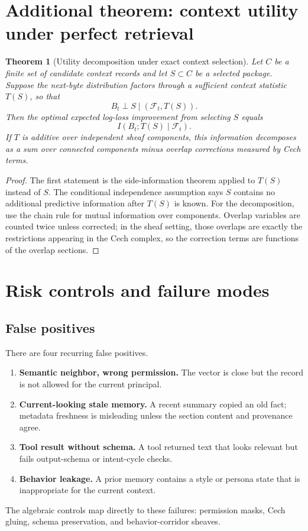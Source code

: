 \documentclass[11pt]{article}
\newtheorem{theorem}{Theorem}[section]
\numberwithin{equation}{section}
\begin{document}
\section{Additional theorem: context utility under perfect retrieval}
\begin{theorem}[Utility decomposition under exact context selection]
Let $C$ be a finite set of candidate context records and let $S\subset C$ be a selected package. Suppose the next-byte distribution factors through a sufficient context statistic $T(S)$, so that
\begin{equation}
B_t\perp S\mid (\mathcal{F}_t,T(S)).
\end{equation}
Then the optimal expected log-loss improvement from selecting $S$ equals
\begin{equation}
I(B_t;T(S)\mid\mathcal{F}_t).
\end{equation}
If $T$ is additive over independent sheaf components, this information decomposes as a sum over connected components minus overlap corrections measured by Cech terms.
\end{theorem}
\begin{proof}
The first statement is the side-information theorem applied to $T(S)$ instead of $S$. The conditional independence assumption says $S$ contains no additional predictive information after $T(S)$ is known. For the decomposition, use the chain rule for mutual information over components. Overlap variables are counted twice unless corrected; in the sheaf setting, those overlaps are exactly the restrictions appearing in the Cech complex, so the correction terms are functions of the overlap sections.
\end{proof}

\section{Risk controls and failure modes}
\subsection{False positives}
There are four recurring false positives.
\begin{enumerate}
\item \textbf{Semantic neighbor, wrong permission.} The vector is close but the record is not allowed for the current principal.
\item \textbf{Current-looking stale memory.} A recent summary copied an old fact; metadata freshness is misleading unless the section content and provenance agree.
\item \textbf{Tool result without schema.} A tool returned text that looks relevant but fails output-schema or intent-cycle checks.
\item \textbf{Behavior leakage.} A prior memory contains a style or persona state that is inappropriate for the current context.
\end{enumerate}
The algebraic controls map directly to these failures: permission masks, Cech gluing, schema preservation, and behavior-corridor sheaves.
\end{document}
